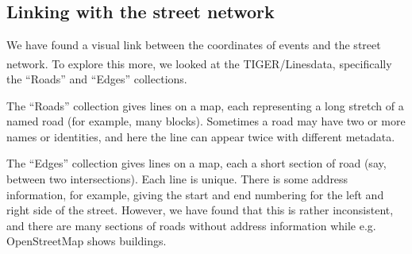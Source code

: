 \documentclass[twoside,a4paper,twocolumn,10pt]{article}
\theoremstyle{plain}
\theoremstyle{definition}
\newcommand{\regsym}{\textsuperscript{\textregistered}}
\begin{document}
\subsection{Linking with the street network}\label{sec:link_st_net}

We have found a visual link between the coordinates of events and the street network.
To explore this more, we looked at the TIGER/Lines\regsym data, specifically the
``Roads'' and ``Edges'' collections.

The ``Roads'' collection gives lines on a map, each representing a long stretch of
a named road (for example, many blocks).  Sometimes a road may have two or more names
or identities, and here the line can appear twice with different metadata.

The ``Edges'' collection gives lines on a map, each a short section of road (say,
between two intersections).  Each line is unique.  There is some address information,
for example, giving the start and end numbering for the left and right side of the
street.  However, we have found that this is rather inconsistent, and there are many
sections of roads without address information while e.g. OpenStreetMap shows buildings.
\end{document}
